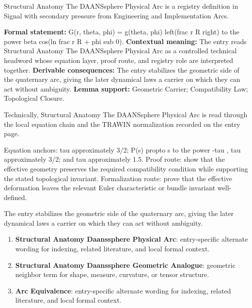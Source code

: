 
\begingroup\small
{}
Structural Anatomy The DAANSsphere Physical Arc is a registry definition in Signal with secondary pressure from Engineering and Implementation Arcs.

\begingroup\footnotesize\setlength{\emergencystretch}{3em}\sloppy
\textbf{Formal statement:} G(r, theta, phi) = g(theta, phi) left(frac r R right) to the power beta cos(ln frac r R + phi sub 0). \textbf{Contextual meaning:} The entry reads Structural Anatomy The DAANSsphere Physical Arc as a controlled technical headword whose equation layer, proof route, and registry role are interpreted together. \textbf{Derivable consequences:} The entry stabilizes the geometric side of the quaternary arc, giving the later dynamical laws a carrier on which they can act without ambiguity. \textbf{Lemma support:} Geometric Carrier; Compatibility Law; Topological Closure.\par
\endgroup

Technically, Structural Anatomy The DAANSsphere Physical Arc is read through the local equation chain and the TRAWIN normalization recorded on the entry page.

Equation anchors: tau approximately 3/2; P(s) propto s to the power -tau , tau approximately 3/2; and tau approximately 1.5. Proof route: show that the effective geometry preserves the required compatibility condition while supporting the stated topological invariant. Formalization route: prove that the effective deformation leaves the relevant Euler characteristic or bundle invariant well-defined.

The entry stabilizes the geometric side of the quaternary arc, giving the later dynamical laws a carrier on which they can act without ambiguity.
\endgroup

\begin{enumerate}[leftmargin=1.6em,itemsep=6pt,topsep=4pt]
\item \textbf{Structural Anatomy Daanssphere Physical Arc}: entry-specific alternate wording for indexing, related literature, and local formal context.
\item \textbf{Structural Anatomy Daanssphere Geometric Analogue}: geometric neighbor term for shape, measure, curvature, or tensor structure.
\item \textbf{Arc Equivalence}: entry-specific alternate wording for indexing, related literature, and local formal context.
\end{enumerate}

